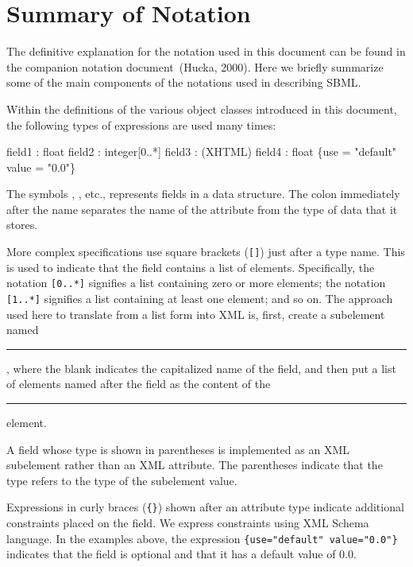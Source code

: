 \documentclass[10pt]{cekarticle}
\begin{document}
\section{Summary of Notation}
\label{apdx:notation}

The definitive explanation for the notation used in this document can be
found in the companion notation document~(Hucka, 2000).  Here we briefly
summarize some of the main components of the notations used in describing
SBML.

Within the definitions of the various object classes introduced in this
document, the following types of expressions are used many times:

\begin{example}
  field1 : float
  field2 : integer[0..*]
  field3 : (XHTML)
  field4 : float \{use = "default" value = "0.0"\}
\end{example}

The symbols , , etc., represents fields in a
data structure.  The colon immediately after the name separates the name of
the attribute from the type of data that it stores.

More complex specifications use square brackets (\texttt{[]}) just after a
type name.  This is used to indicate that the field contains a list of
elements.  Specifically, the notation \texttt{[0..*]} signifies a list
containing zero or more elements; the notation \texttt{[1..*]} signifies a
list containing at least one element; and so on.  The approach used here to
translate from a list form into XML is, first, create a subelement named
\rule{0.5in}{0.5pt}, where the blank indicates the
capitalized name of the field, and then put a list of elements named after
the field as the content of the \rule{0.5in}{0.5pt}
element.

A field whose type is shown in parentheses is implemented as an
XML subelement rather than an XML attribute.  The parentheses
indicate that the type refers to the type of the subelement value.

Expressions in curly braces (\texttt{\{\}}) shown after an
attribute type indicate additional constraints placed on the
field.  We express constraints using XML Schema language.  In the
examples above, the expression \texttt{\{use="default"
value="0.0"\}} indicates that the field  is
optional and that it has a default value of $0.0$.
\end{document}
